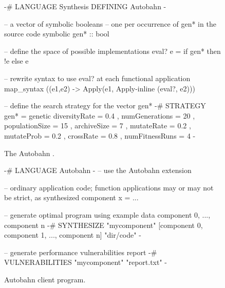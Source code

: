 \begin{figure}[t]
        
\centering
\begin{mylisting}
{-# LANGUAGE Synthesis DEFINING Autobahn -}

-- a vector of symbolic booleans -- one per occurrence of gen* in the source code
symbolic gen* :: bool

-- define the space of possible implementations
eval? e =
  if gen* then
    !e
  else
    e

-- rewrite syntax to use eval? at each functional application
map_syntax (\Apply(e1,e2) -> Apply(e1, Apply-inline (eval?, e2)))

-- define the search strategy for the vector gen*
{-# STRATEGY gen* = 
              genetic { diversityRate = 0.4
                      , numGenerations = 20
                      , populationSize = 15
                      , archiveSize = 7
                      , mutateRate = 0.2
                      , mutateProb = 0.2
                      , crossRate = 0.8
                      , numFitnessRuns = 4 }
-}
\end{mylisting}
\caption{The Autobahn \rasp.  
}
\label{fig:autobahn-via-synthesis}
\end{figure}

\begin{figure}[t]
        
\centering
\begin{mylisting}
{-# LANGUAGE Autobahn -}    -- use the Autobahn extension

-- ordinary application code;  function applications may or may not be strict, as synthesized
component x = ...

-- generate optimal program using example data component 0, ..., component n
{-# SYNTHESIZE "mycomponent" [component 0, component 1, ..., component n] "dir/code" -}

-- generate performance vulnerabilities report
{-# VULNERABILITIES "mycomponent" "report.txt" -}
\end{mylisting}
\caption{Autobahn client program.}
\label{fig:autobahn-client}
\end{figure}

